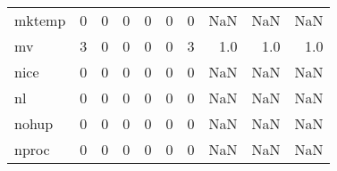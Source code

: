 \begin{tabular}{lrrrrrrrrr}
mktemp    &                                       0 &                                                  0 &                                                  0 &                                                  0 &                                                  0 &                                                  0 &                                                NaN &                                    NaN &                                  NaN \\
mv        &                                       3 &                                                  0 &                                                  0 &                                                  0 &                                                  0 &                                                  3 &                                                1.0 &                                    1.0 &                                  1.0 \\
nice      &                                       0 &                                                  0 &                                                  0 &                                                  0 &                                                  0 &                                                  0 &                                                NaN &                                    NaN &                                  NaN \\
nl        &                                       0 &                                                  0 &                                                  0 &                                                  0 &                                                  0 &                                                  0 &                                                NaN &                                    NaN &                                  NaN \\
nohup     &                                       0 &                                                  0 &                                                  0 &                                                  0 &                                                  0 &                                                  0 &                                                NaN &                                    NaN &                                  NaN \\
nproc     &                                       0 &                                                  0 &                                                  0 &                                                  0 &                                                  0 &                                                  0 &                                                NaN &                                    NaN &                                  NaN \\

\end{tabular}

